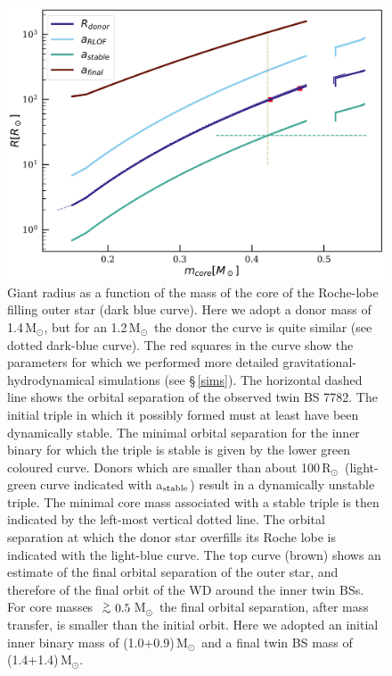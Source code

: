 \documentclass[twocolumn]{aastex62}
\newcommand{\MSun}{\mbox{M$_\odot$}}
\newcommand{\RSun}{\mbox{R$_\odot$}}
\def\apgt{\ {\raise-.5ex\hbox{$\buildrel>\over\sim$}}\ }
\begin{document}
\begin{figure}[ht!]
  \includegraphics[width=\columnwidth]{fig_M14MSun_outerorbit.pdf}
  \caption{Giant radius as a function of the mass of the core of the
    Roche-lobe filling outer star (dark blue curve).  Here we adopt a
    donor mass of 1.4\,\MSun, but for an 1.2\,\MSun\, the donor the
    curve is quite similar (see dotted dark-blue curve).  The red
    squares in the curve show the parameters for which we performed
    more detailed gravitational-hydrodynamical simulations (see
    \S\,\ref{sims}).  The horizontal dashed line shows the orbital
    separation of the observed twin BS 7782.  The initial triple in
    which it possibly formed must at least have been dynamically
    stable. The minimal orbital separation for the inner binary for
    which the triple is stable is given by the lower green coloured
    curve.  Donors which are smaller than about 100\,\RSun\,
    (light-green curve indicated with a$_{\rm stable}$) result in a
    dynamically unstable triple. The minimal core mass associated with
    a stable triple is then indicated by the left-most vertical dotted
    line.  The orbital separation at which the donor star overfills
    its Roche lobe is indicated with the light-blue curve. The top
    curve (brown) shows an estimate of the final orbital separation of
    the outer star, and therefore of the final orbit of the WD around
    the inner twin BSs.  For core masses $\apgt 0.5$\,\MSun\, the
    final orbital separation, after mass transfer, is smaller than the
    initial orbit.  Here we adopted an initial inner binary mass of
    (1.0+0.9)\,\MSun\, and a final twin BS mass of (1.4+1.4)\,\MSun.
\label{fig:tertiarymass_vs_size}}
\end{figure}
\end{document}
